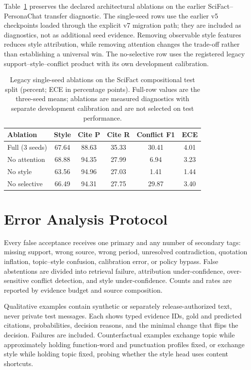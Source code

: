 \documentclass[11pt,a4paper]{article}
\begin{document}
Table~\ref{tab:ablations} preserves the declared architectural ablations on
the earlier SciFact--PersonaChat transfer diagnostic.  The single-seed rows use the earlier v5
checkpoints loaded through the explicit v7 migration path; they are included
as diagnostics, not as additional seed evidence.  Removing observable style
features reduces style attribution, while removing attention changes the
trade-off rather than establishing a universal win.  The no-selective row
uses the registered legacy support--style--conflict product with its own
development calibration.

\begin{table}[t]
\centering
\scriptsize
\setlength{\tabcolsep}{2.5pt}
\begin{tabular}{lccccc}
\toprule
Ablation & Style & Cite P & Cite R & Conflict F1 & ECE \\
\midrule
Full (3 seeds) & 67.64 & 88.63 & 35.33 & 30.41 & 4.01 \\
No attention & 68.88 & 94.35 & 27.99 & 6.94 & 3.23 \\
No style & 63.56 & 94.96 & 27.03 & 1.41 & 1.44 \\
No selective & 66.49 & 94.31 & 27.75 & 29.87 & 3.40 \\
\bottomrule
\end{tabular}
\caption{Legacy single-seed ablations on the SciFact compositional test split
(percent; ECE in percentage points).  Full-row values are the three-seed
means; ablations are measured diagnostics with separate development
calibration and are not selected on test performance.}
\label{tab:ablations}
\end{table}

\section{Error Analysis Protocol}

Every false acceptance receives one primary and any number of secondary tags:
missing support, wrong source, wrong period, unresolved contradiction,
quotation inflation, topic--style confusion, calibration error, or policy
bypass.  False abstentions are divided into retrieval failure, attribution
under-confidence, over-sensitive conflict detection, and style
under-confidence.  Counts and rates are reported by evidence budget and source
composition.

Qualitative examples contain synthetic or separately release-authorized text,
never private test messages.  Each shows typed evidence IDs, gold and predicted
citations, probabilities, decision reasons, and the minimal change that flips
the decision.  Failures are included.  Counterfactual examples exchange topic
while approximately holding function-word and punctuation profiles fixed, or
exchange style while holding topic fixed, probing whether the style head uses
content shortcuts.
\end{document}
